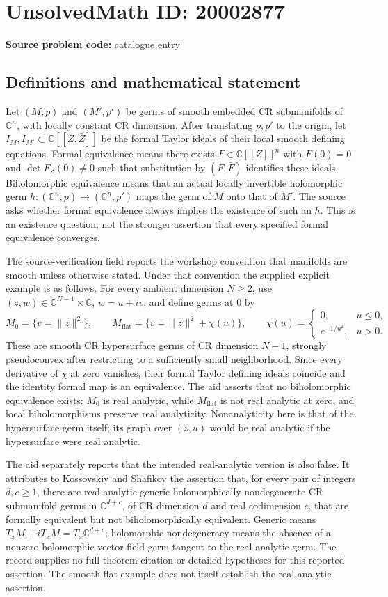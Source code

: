 \documentclass[11pt]{article}
\newcommand{\C}{\mathbb{C}}
\begin{document}
\section*{UnsolvedMath ID: 20002877}
\textbf{Source problem code:} catalogue entry
\subsection{Definitions and mathematical statement}
Let $(M,p)$ and $(M',p')$ be germs of smooth embedded CR submanifolds of $\C^n$, with locally constant CR dimension. After translating $p,p'$ to the origin, let $I_M,I_{M'}\subset\C[[Z,\bar Z]]$ be the formal Taylor ideals of their local smooth defining equations. Formal equivalence means there exists $F\in\C[[Z]]^n$ with $F(0)=0$ and $\det F_Z(0)\ne0$ such that substitution by $(F,\overline F)$ identifies these ideals. Biholomorphic equivalence means that an actual locally invertible holomorphic germ $h:(\C^n,p)\to(\C^n,p')$ maps the germ of $M$ onto that of $M'$. The source asks whether formal equivalence always implies the existence of such an $h$. This is an existence question, not the stronger assertion that every specified formal equivalence converges.

The source-verification field reports the workshop convention that manifolds are smooth unless otherwise stated. Under that convention the supplied explicit example is as follows. For every ambient dimension $N\geq2$, use $(z,w)\in\C^{N-1}\times\C$, $w=u+iv$, and define germs at $0$ by
\[
M_0=\{v=\|z\|^2\},\qquad
M_{\mathrm{flat}}=\{v=\|z\|^2+\chi(u)\},\qquad
\chi(u)=\begin{cases}0,&u\leq0,\\e^{-1/u^2},&u>0.\end{cases}
\]
These are smooth CR hypersurface germs of CR dimension $N-1$, strongly pseudoconvex after restricting to a sufficiently small neighborhood. Since every derivative of $\chi$ at zero vanishes, their formal Taylor defining ideals coincide and the identity formal map is an equivalence. The aid asserts that no biholomorphic equivalence exists: $M_0$ is real analytic, while $M_{\mathrm{flat}}$ is not real analytic at zero, and local biholomorphisms preserve real analyticity. Nonanalyticity here is that of the hypersurface germ itself; its graph over $(z,u)$ would be real analytic if the hypersurface were real analytic.

The aid separately reports that the intended real-analytic version is also false. It attributes to Kossovskiy and Shafikov the assertion that, for every pair of integers $d,c\geq1$, there are real-analytic generic holomorphically nondegenerate CR submanifold germs in $\C^{d+c}$, of CR dimension $d$ and real codimension $c$, that are formally equivalent but not biholomorphically equivalent. Generic means $T_xM+iT_xM=T_x\C^{d+c}$; holomorphic nondegeneracy means the absence of a nonzero holomorphic vector-field germ tangent to the real-analytic germ. The record supplies no full theorem citation or detailed hypotheses for this reported assertion. The smooth flat example does not itself establish the real-analytic assertion.
\end{document}
